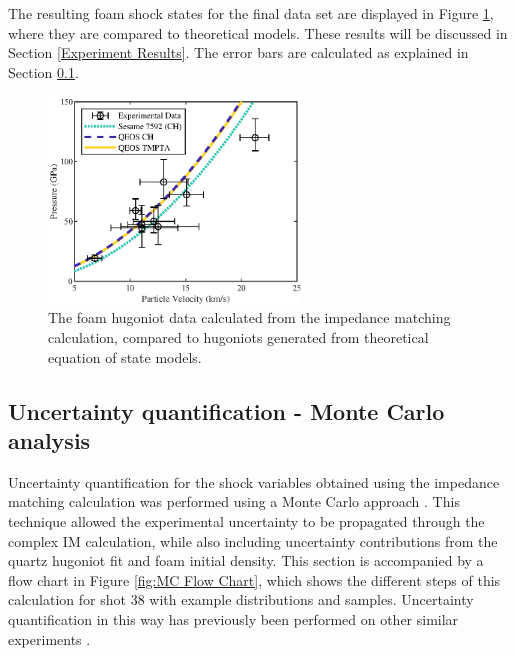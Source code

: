 The resulting foam shock states for the final data set are displayed in Figure \ref{fig:Hugoniot}, where they are compared to theoretical models. These results will be discussed in Section \ref{Experiment Results}. The error bars are calculated as explained in Section \ref{MC error}.

\begin{figure} [h]
\begin{centering}
\includegraphics[width=0.6\textwidth]{figures/Experiment/Hugoniot.eps}%
\caption{\label{fig:Hugoniot} The foam hugoniot data calculated from the impedance matching calculation, compared to hugoniots generated from theoretical equation of state models.}
\end{centering}
\end{figure}


\subsection{Uncertainty quantification - Monte Carlo analysis} \label{MC error}

Uncertainty quantification for the shock variables obtained using the impedance matching calculation was performed using a Monte Carlo approach \cite{Root2010}. This technique allowed the experimental uncertainty to be propagated through the complex IM calculation, while also including uncertainty contributions from the quartz hugoniot fit and foam initial density. This section is accompanied by a flow chart in Figure \ref{fig:MC Flow Chart}, which shows the different steps of this calculation for shot 38 with example distributions and samples. Uncertainty quantification in this way has previously been performed on other similar experiments \cite{Knudson2013, Root2010, Root2013, McCoy2016}.

